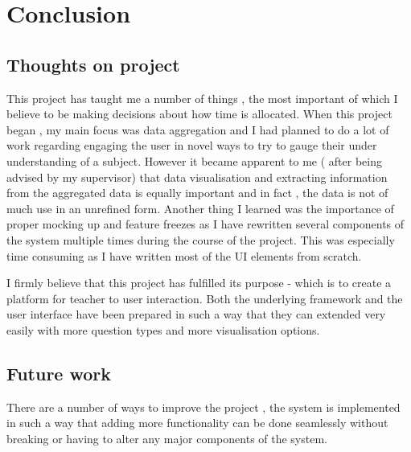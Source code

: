 \chapter{Conclusion}

\section{Thoughts on project}
This project has taught me a number of things , the most important of which I believe to be making decisions about how time is allocated.
When this project began , my main focus was data aggregation and I had planned to do a lot of work regarding engaging the user in novel ways to try to gauge their under understanding of a subject. However it became apparent to me ( after being advised by my supervisor) that data visualisation and extracting information from the aggregated data is equally important and in fact , the data is not of much use in an unrefined form.
Another thing I learned was the importance of proper mocking up and feature freezes as I have rewritten several components of the system multiple times during the course of the project. This was especially time consuming as I have written most of the UI elements from scratch.

I firmly believe that this project has fulfilled its purpose - which is to create a platform for teacher to user interaction. Both the underlying framework and the user interface have been prepared in such a way that they can extended very easily with more question types and more visualisation options.


\section{Future work} \label{future}
There are a number of ways to improve the project , the system is implemented in such a way that adding more functionality can be done seamlessly without breaking or having to alter any major components of the system.

